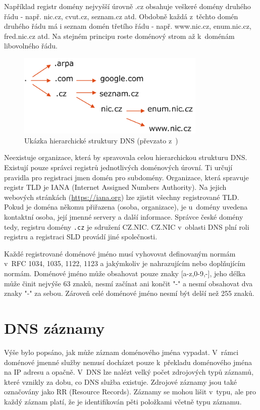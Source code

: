\documentclass[thesis=M,czech]{src/FITthesis}[2019/12/23]
\begin{document}
Například registr domény nejvyšší úrovně .cz obsahuje veškeré domény druhého řádu - např. nic.cz, cvut.cz, seznam.cz atd. Obdobně každá z~těchto domén druhého řádu má i seznam domén třetího řádu - např. www.nic.cz, enum.nic.cz, fred.nic.cz atd. Na stejném principu roste doménový strom až k~doménám libovolného řádu. \cite{cznic-dns, RFC1035}
 
\begin{figure}[ht]
  \centering
   \includegraphics[width=0.8\textwidth]{images/domenovy_strom.png}
   \caption{Ukázka hierarchické struktury DNS (převzato z~\cite{cznic-dns})}
     \label{fig:ipv4-header}
\end{figure}



Neexistuje organizace, která by spravovala celou hierarchickou strukturu DNS. Existují pouze správci registrů jednotlivých doménových úrovní. Ti určují pravidla pro registraci jmen domén pro subdomény. Organizace, která spravuje registr TLD je IANA (Internet Assigned Numbers Authority). Na jejich webových stránkách (\url{https://iana.org}) lze zjistit všechny registrované TLD. Pokud je doména někomu přiřazena (osoba, organizace), je u~domény uvedena kontaktní osoba, její jmenné servery a další informace. Správce české domény tedy, registru domény \texttt{.cz} je sdružení CZ.NIC. CZ.NIC v~oblasti DNS plní roli registru a registraci SLD provádí jiné společnosti. \cite{iana}

Každé registrované doménové jméno musí vyhovovat definovaným normám v~RFC 1034, 1035, 1122, 1123 a jakýmkoliv je nahrazujícím nebo doplňujícím normám. Doménové jméno může obsahovat pouze  znaky [a-­z,0-­9,-­], jeho délka může činit nejvýše 63 znaků, nesmí začínat ani končit "-" a nesmí obsahovat dva znaky "-" za sebou. Zároveň celé doménové jméno nesmí být delší než 255 znaků. \cite{RFC1035, cznic-rules}


\section{DNS záznamy}
\label{sec:DNSrecords}
Výše bylo popsáno, jak může záznam doménového jména vypadat. V~rámci doménové jmenné služby nemusí docházet pouze k~překladu doménového \linebreak jména na IP adresu a opačně. V~DNS lze nalézt velký počet zdrojových typů záznamů, které vznikly za dobu, co DNS služba existuje. Zdrojové záznamy jsou také označovány jako RR (Resource Records). Záznamy se mohou lišit v~typu, ale pro každý záznam platí, že je identifikován pěti položkami včetně typu záznamu. 
 
\end{document}
